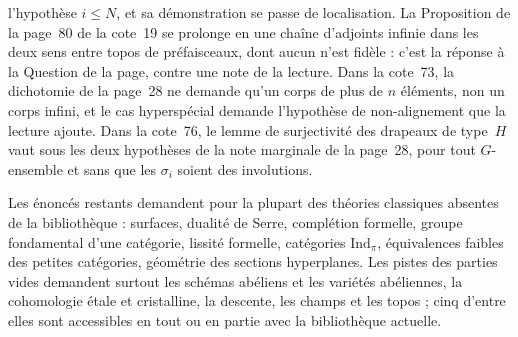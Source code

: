 l'hypothèse $i \leq N$, et sa démonstration se passe de localisation. La Proposition de la page~80 de la cote~19 se prolonge en une chaîne d'adjoints infinie dans les deux sens entre topos de préfaisceaux, dont aucun n'est fidèle : c'est la réponse à la Question de la page, contre une note de la lecture. Dans la cote~73, la dichotomie de la page~28 ne demande qu'un corps de plus de $n$ éléments, non un corps infini, et le cas hyperspécial demande l'hypothèse de non-alignement que la lecture ajoute. Dans la cote~76, le lemme de surjectivité des drapeaux de type~$H$ vaut sous les deux hypothèses de la note marginale de la page~28, pour tout $G$-ensemble et sans que les $\sigma_i$ soient des involutions.

Les énoncés restants demandent pour la plupart des théories classiques absentes de la bibliothèque : surfaces, dualité de Serre, complétion formelle, groupe fondamental d'une catégorie, lissité formelle, catégories $\mathrm{Ind}_\pi$, équivalences faibles des petites catégories, géométrie des sections hyperplanes. Les pistes des parties vides demandent surtout les schémas abéliens et les variétés abéliennes, la cohomologie étale et cristalline, la descente, les champs et les topos ; cinq d'entre elles sont accessibles en tout ou en partie avec la bibliothèque actuelle.
